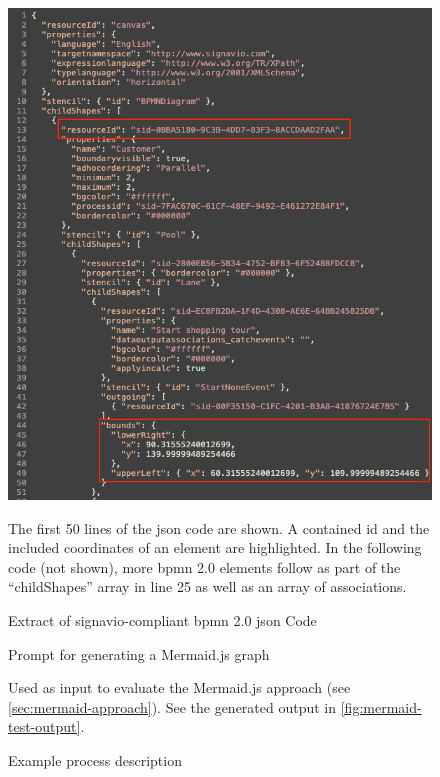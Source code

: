 \begin{figure}[h]
    \centering
    \includegraphics[width=\textwidth,height=\textheight,keepaspectratio]{../assets/images/Supermarket Shopping Signavio BPMN JSON Code Example.png}
    \caption{Extract of \gls{signavio}-compliant \acs{bpmn} 2.0 \acs{json} Code}
    \label{fig:code-example}

    \medskip
    \small
    The first 50 lines of the \acs{json} code are shown. A contained \acs{id} and the included coordinates of an element are highlighted. In the following code (not shown), more \acs{bpmn} 2.0 elements follow as part of the ``childShapes'' array in line 25 as well as an array of associations.
\end{figure}


\begin{figure}[h]
    
    \caption{Prompt for generating a Mermaid.js graph}
    \label{lst:mermaid-prompt}
\end{figure}

\begin{figure}[h]
    
    \caption{Example process description}
    \label{lst:mermaid-test-input}

    \medskip
    \small
    Used as input to evaluate the Mermaid.js approach (see \autoref{sec:mermaid-approach}). See the generated output in \autoref{fig:mermaid-test-output}.
\end{figure}


